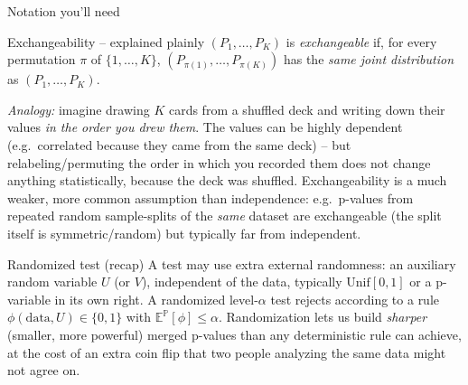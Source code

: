 \documentclass[aspectratio=169,10pt]{beamer}
\newcommand{\PP}{\mathbb{P}}
\newcommand{\EE}{\mathbb{E}}
\begin{document}
\begin{frame}[allowframebreaks]{Notation you'll need}
  \begin{block}{Exchangeability -- explained plainly}
    $(P_1,\dots,P_K)$ is \emph{exchangeable} if, for every permutation $\pi$ of $\{1,\dots,K\}$, $(P_{\pi(1)},\dots,P_{\pi(K)})$ has the \emph{same joint distribution} as $(P_1,\dots,P_K)$.

    \emph{Analogy:} imagine drawing $K$ cards from a shuffled deck and writing down their values \emph{in the order you drew them}. The values can be highly dependent (e.g.\ correlated because they came from the same deck) -- but relabeling/permuting the order in which you recorded them does not change anything statistically, because the deck was shuffled. Exchangeability is a much weaker, more common assumption than independence: e.g.\ p-values from repeated random sample-splits of the \emph{same} dataset are exchangeable (the split itself is symmetric/random) but typically far from independent.
  \end{block}

  \begin{block}{Randomized test (recap)}
    A test may use extra external randomness: an auxiliary random variable $U$ (or $V$), independent of the data, typically $\mathrm{Unif}[0,1]$ or a p-variable in its own right. A randomized level-$\alpha$ test rejects according to a rule $\phi(\text{data},U)\in\{0,1\}$ with $\EE^\PP[\phi]\le\alpha$. Randomization lets us build \emph{sharper} (smaller, more powerful) merged p-values than any deterministic rule can achieve, at the cost of an extra coin flip that two people analyzing the same data might not agree on.
  \end{block}
\end{frame}
\end{document}
